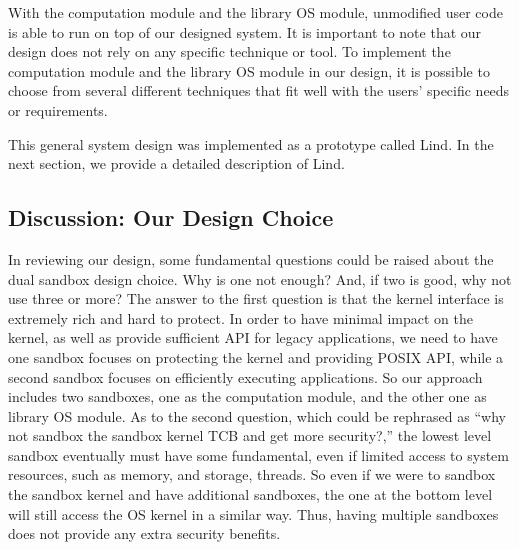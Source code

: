 With the computation module and the library OS module, unmodified user code is able to run on top of our designed system. 
It is important to note that our design does not rely on any specific technique or tool. 
To implement the computation module and the library OS module in our design, 
it is possible to choose from several different techniques that fit well with the users' specific needs or requirements.

This general system design was implemented as a prototype called Lind. 
In the next section, we provide a detailed description of Lind.

\subsection{Discussion: Our Design Choice}

In reviewing our design, some fundamental questions could be raised about the dual sandbox design choice. 
Why is one not enough? And, if two is good, why not use three or more? 
The answer to the first question is that the kernel interface is extremely rich and hard to protect. 
In order to have minimal impact on the kernel, as well as provide sufficient API for legacy applications, 
we need to have one sandbox focuses on protecting the kernel and providing POSIX API, 
while a second sandbox focuses on efficiently executing applications. 
So our approach includes two sandboxes, one as the computation module, 
and the other one as library OS module. As to the second question, 
which could be rephrased as ``why not sandbox the sandbox kernel TCB and get more security?,'' 
the lowest level sandbox eventually must have some fundamental, 
even if  limited access to system resources, such as memory, and storage, threads. 
So even if we were to sandbox the sandbox kernel and have additional sandboxes, 
the one at the bottom level will still access the OS kernel in a similar way. 
Thus, having multiple sandboxes does not provide any extra security benefits. 

